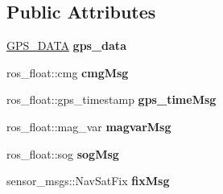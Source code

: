 \subsection*{Public Attributes}
\begin{DoxyCompactItemize}
\item 
\mbox{\label{classGPS__reader_a105510384a32f68ba0b2071802a67ef2}} 
\hyperlink{structGPS__DATA}{G\+P\+S\+\_\+\+D\+A\+TA} {\bfseries gps\+\_\+data}
\item 
\mbox{\label{classGPS__reader_ab08127115b385e07851bb4b6c8492473}} 
ros\+\_\+float\+::cmg {\bfseries cmg\+Msg}
\item 
\mbox{\label{classGPS__reader_a8f04f46e401652161415b0c73c1a5b00}} 
ros\+\_\+float\+::gps\+\_\+timestamp {\bfseries gps\+\_\+time\+Msg}
\item 
\mbox{\label{classGPS__reader_ab97b67a2e2646df6956bcc080fe8d687}} 
ros\+\_\+float\+::mag\+\_\+var {\bfseries magvar\+Msg}
\item 
\mbox{\label{classGPS__reader_a4f6b645cee68742e584c36498d4bd683}} 
ros\+\_\+float\+::sog {\bfseries sog\+Msg}
\item 
\mbox{\label{classGPS__reader_a6c5001bfda4b20c8c627e84240ebf87a}} 
sensor\+\_\+msgs\+::\+Nav\+Sat\+Fix {\bfseries fix\+Msg}
\end{DoxyCompactItemize}
